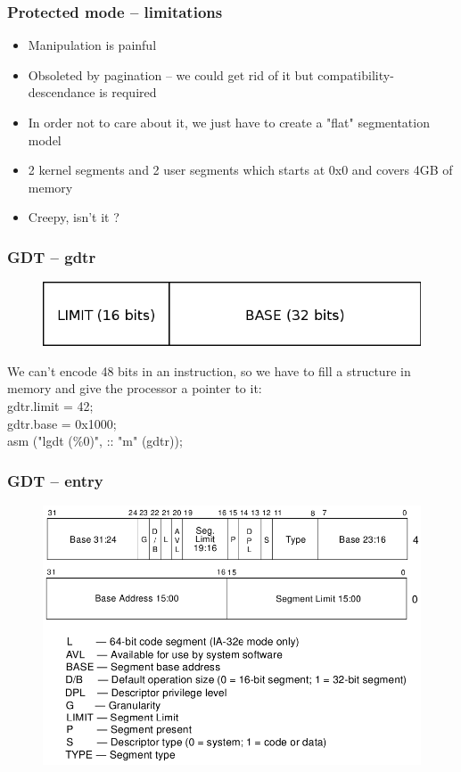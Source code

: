 \documentclass{beamer}
\begin{document}
\begin{frame}
  \frametitle{Protected mode -- limitations}

  \begin{itemize}
  \item<1->
    Manipulation is painful
  \item<1->
    Obsoleted by pagination -- we could get rid of it but compatibility-descendance is required
  \end{itemize}
  \begin{itemize}
  \item<2->
    In order not to care about it, we just have to create a "flat" segmentation model
  \item<2->
    2 kernel segments and 2 user segments which starts at 0x0 and covers 4GB of memory
  \item<2->
    Creepy, isn't it ?
  \end{itemize}
\end{frame}

\begin{frame}
  \frametitle{GDT -- gdtr}

  \begin{figure}
  \includegraphics[scale=0.3]{gdtr.png}
  \end{figure}
  We can't encode 48 bits in an instruction, so we have to fill a structure in memory and give the processor a pointer to it:\\
  \vspace{10pt}
  gdtr.limit = 42;\\
  gdtr.base = 0x1000;\\
  asm ("lgdt (\%0)", :: "m" (gdtr));
\end{frame}

\begin{frame}
  \frametitle{GDT -- entry}

  \begin{figure}
  \includegraphics[scale=0.35]{gdte.png}
  \end{figure}
\end{frame}
\end{document}
